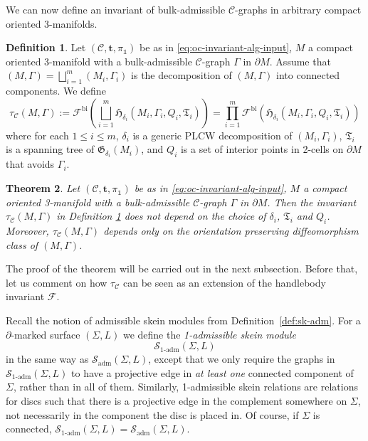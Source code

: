 \documentclass[11pt]{amsart}
\newtheorem{thm}{Theorem}[section]
\theoremstyle{definition}
\newtheorem{definition}[thm]{Definition}
\numberwithin{equation}{section}
\def\bd{{\partial}}
\def\mtr{{\mathbf{t}}} %
\def\adm{\operatorname{adm}}
\def\cgpt{\mathscr{F}}
\def\sk{\cS}
\newcommand{\ourGraph}{\fG}
\newcommand{\spnTree}{\fT}
\def\cC{\mathcal{C}}
\def\cS{\mathcal{S}}
\def\de{\delta}
\def\fG{\mathfrak{G}}
\def\fH{\mathfrak{H}}
\def\fT{{\mathfrak{T}}}
\def\1{{\mathds{1}}}
\begin{document}
We can now define an invariant of bulk-admissible $\cC$-graphs in arbitrary compact oriented 3-manifolds.


\begin{definition}\label{def:tau}
Let $(\cC,\mtr,\pi_\1)$ be as in \eqref{eq:oc-invariant-alg-input}, $M$ a compact oriented 3-manifold with a bulk-admissible $\cC$-graph $\Gamma$ in $\bd M$. 
Assume that $(M, \Gamma) = \bigsqcup_{i=1}^{m}(M_i, \Gamma_i)$ is the decomposition of $(M, \Gamma)$ into connected components. We define 
\[\tau_{\cC}(M, \Gamma) := \cgpt^\mathrm{bi}(\bigsqcup_{i=1}^{m} \fH_{\de_{i}}(M_i, \Gamma_i, Q_i, \spnTree_i)) = \prod_{i=1}^{m} \cgpt^\mathrm{bi}(\fH_{\de_{i}}(M_i, \Gamma_i, Q_i, \spnTree_i))\]
where for each $1 \le i \le m$, $\de_{i}$ is a generic PLCW decomposition of $(M_{i}, \Gamma_{i})$, $\spnTree_{i}$ is a spanning tree of $\ourGraph_{\de_{i}}(M_{i})$, and $Q_{i}$ is a set of interior points in 2-cells on $\partial M$ that avoids $\Gamma_{i}$.
\end{definition}

\begin{thm}\label{thm:tau-well-def}
Let $(\cC,\mtr,\pi_\1)$ be as in \eqref{eq:oc-invariant-alg-input}, $M$ a compact oriented 3-manifold with a bulk-admissible $\cC$-graph $\Gamma$ in $\bd M$. Then the invariant $\tau_{\cC}(M, \Gamma)$ in Definition \ref{def:tau} does not depend on the choice of $\de_{i}$, $\spnTree_{i}$ and $Q_{i}$. Moreover, $\tau_{\cC}(M, \Gamma)$ depends only on the orientation preserving diffeomorphism class of $(M, \Gamma)$.
\end{thm}

The proof of the theorem will be carried out in the next subsection. Before that, let us comment on how $\tau_{\cC}$ can be seen as an extension of the handlebody invariant $\cgpt$.

\medskip

Recall the notion of admissible skein modules from Definition~\ref{def:sk-adm}. For a $\bd$-marked surface $(\Sigma,L)$ we define the \textit{1-admissible skein module} 
\begin{equation}
    \sk_{1\text{-adm}}(\Sigma,L)     
\end{equation}
in the same way as $\sk_{\adm}(\Sigma,L)$, except that we only require the graphs in $\sk_{1\text{-adm}}(\Sigma,L)$ to have a projective edge in \textit{at least one} connected component of $\Sigma$, rather than in all of them. Similarly, 1-admissible skein relations are relations for discs such that there is a projective edge in the complement somewhere on $\Sigma$, not necessarily in the component the disc is placed in. Of course, if $\Sigma$ is connected, $\sk_{1\text{-adm}}(\Sigma,L)=\sk_{\adm}(\Sigma,L)$. 
\end{document}
